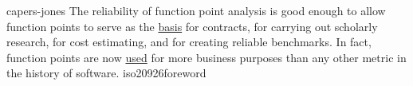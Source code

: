 \documentclass{article}
\begin{document}

\lnQuote
  {capers-jones}
  {The reliability of function point analysis is good enough to allow function points to serve as the \ul{basis} for contracts, for carrying out scholarly research, for cost estimating, and for creating reliable benchmarks. In fact, function points are now \ul{used} for more business purposes than any other metric in the history of software.}
  {iso20926foreword}

\end{document}
